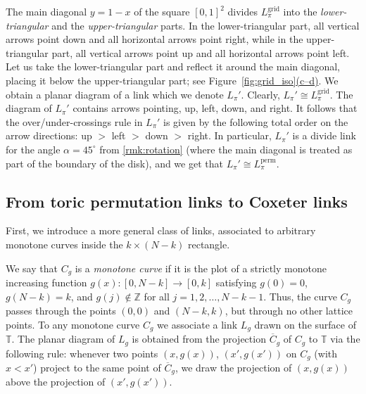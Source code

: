 \documentclass[11pt]{article}
\theoremstyle{definition}
\numberwithin{equation}{section}
\newcommand\Z{\mathbb{Z}}
\newcommand\perm{\operatorname{perm}}
\newcommand\Lperm{L^{\perm}}
\newcommand\grid{\operatorname{grid}}
\newcommand\Lgrid{L^{\grid}}
\newcommand\T{\mathbb{T}}
\newcommand\Cproj{\overline{C}}
\def\figref#1(#2){Figure~\hyperref[#1]{\ref*{#1}(#2)}}
\newcommand\n{N}
\begin{document}
The main diagonal $y=1-x$ of the square $[0,1]^2$ divides $\Lgrid_\pi$ into the \emph{lower-triangular} and the \emph{upper-triangular} parts. In the lower-triangular part, all vertical arrows point down and all horizontal arrows point right, while in the upper-triangular part, all vertical arrows point up and all horizontal arrows point left. 
Let us take the lower-triangular part and reflect it around the main diagonal, placing it below the upper-triangular part; see \figref{fig:grid_iso}(c--d). We obtain a planar diagram of a link which we denote $L_\pi'$. Clearly, $L_\pi'\cong \Lgrid_\pi$. The diagram of $L_\pi'$ contains arrows pointing, up, left, down, and right. It follows that the over/under-crossings rule  in $L_\pi'$ is given by the following total order on the arrow directions: up $>$ left $>$ down $>$ right. In particular, $L_\pi'$ is a divide link for the angle $\alpha=45^\circ$ from \cref{rmk:rotation} (where the main diagonal is treated as part of the boundary of the disk), and we get that $L_\pi'\cong\Lperm_\pi$. 
%

\subsection{From toric permutation links to Coxeter links}\label{sec:tor_to_Cox}
First, we introduce a more general class of links, associated to arbitrary monotone curves inside the $k\times(\n-k)$ rectangle.

%
%
We say that $C_g$ is a \emph{monotone curve} if it is the plot of a strictly monotone increasing function $g(x):[0,\n-k]\to[0,k]$ satisfying $g(0)=0$, $g(\n-k)=k$, and $g(j)\notin\Z$ for all $j=1,2,\dots,\n-k-1$. Thus, the curve $C_g$ passes through the points $(0,0)$ and $(\n-k,k)$, but through no other lattice points. To any monotone curve $C_g$ we associate a link $L_g$ drawn on the surface of $\T$. The planar diagram of $L_g$ is obtained from the projection $\Cproj_g$ of $C_g$ to $\T$ via the following rule: whenever  two points $(x,g(x))$, $(x',g(x'))$ on $C_g$ (with $x<x'$) project to the same point of $\Cproj_g$, we draw the projection of $(x,g(x))$ above the projection of $(x',g(x'))$. 
\end{document}
